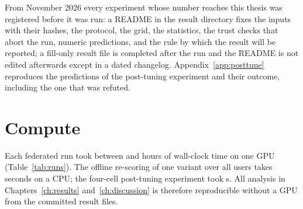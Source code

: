 From November 2026 every experiment whose number reaches this thesis was registered before it
was run: a README in the result directory fixes the inputs with their hashes, the protocol, the
grid, the statistics, the trust checks that abort the run, numeric predictions, and the rule by
which the result will be reported; a fill-only result file is completed after the run and the
README is not edited afterwards except in a dated changelog. Appendix~\ref{app:posttune}
reproduces the predictions of the post-tuning experiment and their outcome, including the one
that was refuted.

\section{Compute}
\label{sec:setup-compute}

Each federated run took between \RunPfedrecHours{} and \RunPersonalizedHours{} hours of
wall-clock time on one GPU (Table~\ref{tab:runs}). The offline re-scoring of one variant over
all \DsUsers{} users takes seconds on a CPU; the four-cell post-tuning experiment took
\PtElapsedSec{} s. All analysis in Chapters~\ref{ch:results} and~\ref{ch:discussion} is
therefore reproducible without a GPU from the committed result files.
